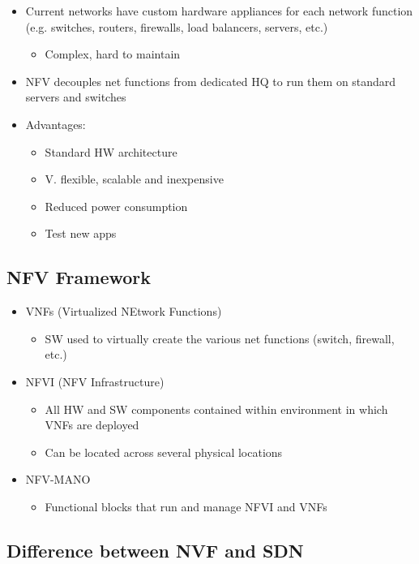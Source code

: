 \begin{itemize}
	\item Current networks have custom hardware appliances for each network
		function (e.g. switches, routers, firewalls, load balancers,
		servers, etc.)
	\begin{itemize}
		\item Complex, hard to maintain
	\end{itemize}
	\item NFV decouples net functions from dedicated HQ to run them on
		standard servers and switches
	\item Advantages:
	\begin{itemize}
		\item Standard HW architecture
		\item V. flexible, scalable and inexpensive
		\item Reduced power consumption
		\item Test new apps
	\end{itemize}
\end{itemize}

\subsection{NFV Framework}

\begin{itemize}
	\item VNFs (Virtualized NEtwork Functions)
	\begin{itemize}
		\item SW used to virtually create the various net functions
			(switch, firewall, etc.)
	\end{itemize}
	\item NFVI (NFV Infrastructure)
	\begin{itemize}
		\item All HW and SW components contained within environment in
			which VNFs are deployed
		\item Can be located across several physical locations
	\end{itemize}
	\item NFV-MANO
	\begin{itemize}
		\item Functional blocks that run and manage NFVI and VNFs
	\end{itemize}
\end{itemize}

\subsection{Difference between NVF and SDN}

